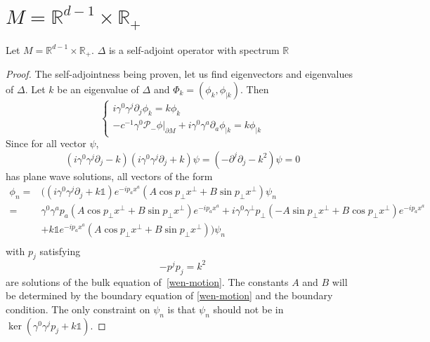 \section{$M = \mathbb{R}^{d-1} \times \mathbb{R}_+$}\label{wen-subsect1}
\begin{proposition}
Let $M = \mathbb{R}^{d-1} \times \mathbb{R}_+$. $\Delta$ is a self-adjoint operator with spectrum $\mathbb{R}$
\end{proposition}
\begin{proof}
The self-adjointness being proven, let us find eigenvectors and eigenvalues of $\Delta$. 
Let $k$ be an eigenvalue of $\Delta$ and $\Phi_k = (\phi_k, \phi_{| k})$. Then
\begin{equation}\label{wen-motion2}
\begin{cases}
i \gamma^0 \gamma^j \partial_j \phi_k = k \phi_k \\
-c^{-1} \gamma^0 \mathcal{P}_- \phi\vert_{\partial M} + i \gamma^0 \gamma^a \partial_a \phi_{| k} = k \phi_{| k}
\end{cases}
\end{equation}
Since for all vector $\psi$,
\begin{equation*}
(i\gamma^0 \gamma^j\partial_j - k )(i\gamma^0 \gamma^j\partial_j + k )\psi = 
(- \partial^j\partial_j - k^2) \psi = 0
\end{equation*}
has plane wave solutions, 
all vectors of the form
\begin{equation*}
\begin{split}
\phi_n = & \Big((i\gamma^0\gamma^j\partial_j + k \mathbb{1}) e^{-ip_a x^a }(A\cos p_\bot x^\bot + B \sin p_\bot x^\bot) \psi_n \\
 = &\gamma^0\gamma^a p_a (A \cos p_\bot x^\bot + B \sin p_\bot x^\bot)e^{-ip_a x^a}
+ i\gamma^0\gamma^\bot p_\bot (-A \sin p_\bot x^\bot + B \cos p_\bot x^\bot) e^{-ip_a x^a} \\
& + k \mathbb{1} e^{-ip_a x^a}(A\cos p_\bot x^\bot + B \sin p_\bot x^\bot)\Big)\psi_n  \\
\end{split}
\end{equation*}
with $p_j$ satisfying
\begin{equation*}
- p^j p_j = k^2
\end{equation*}
are solutions of the bulk equation of~\cref{wen-motion}. 
The constants $A$ and $B$ will be determined by the boundary equation of \cref{wen-motion} and the boundary condition. 
The only constraint on $\psi_n$ is that $\psi_n$ should not be in $\ker( \gamma^0 \gamma^j p_j + k \mathbb{1})$. 

\end{proof}
